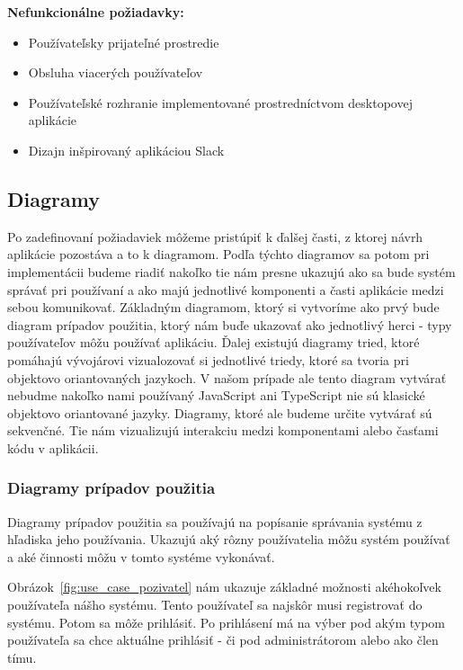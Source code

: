 \textbf{Nefunkcionálne požiadavky:}
\indent\begin{itemize}
    \item Používateľsky prijateľné prostredie
    \item Obsluha viacerých používateľov
    \item Používateľské rozhranie implementované prostredníctvom desktopovej aplikácie
    \item Dizajn inšpirovaný aplikáciou Slack
\end{itemize}

\subsection{Diagramy}
\indent Po zadefinovaní požiadaviek môžeme pristúpiť k ďalšej časti, z ktorej návrh aplikácie pozostáva a to k diagramom. Podľa týchto diagramov sa potom pri implementácii budeme riadiť nakoľko tie nám presne ukazujú ako sa bude systém správať pri používaní a ako majú jednotlivé komponenti a časti aplikácie medzi sebou komunikovať. Základným diagramom, ktorý si vytvoríme ako prvý bude diagram prípadov použitia, ktorý nám buďe ukazovať ako jednotlivý herci - typy používateľov môžu používať aplikáciu. Ďalej existujú diagramy tried, ktoré pomáhajú vývojárovi vizualozovať si jednotlivé triedy, ktoré sa tvoria pri objektovo oriantovaných jazykoch. V našom prípade ale tento diagram vytvárať nebudme nakoľko nami používaný JavaScript ani TypeScript nie sú klasické objektovo oriantované jazyky. Diagramy, ktoré ale budeme určite vytvárať sú sekvenčné. Tie nám vizualizujú interakciu medzi komponentami alebo časťami kódu v aplikácii.

\subsubsection{Diagramy prípadov použitia}
\indent Diagramy prípadov použitia sa používajú na popísanie správania systému z hľadiska jeho používania. Ukazujú aký rôzny používatelia môžu systém používať a aké činnosti môžu v tomto systéme vykonávať.

\indent Obrázok~\ref{fig:use_case_pozivatel} nám ukazuje základné možnosti akéhokoľvek používateľa nášho systému. Tento používateľ sa najskôr musi registrovať do systému. Potom sa môže prihlásiť. Po prihlásení má na výber pod akým typom používateľa sa chce aktuálne prihlásiť - či pod administrátorom alebo ako člen tímu. 

